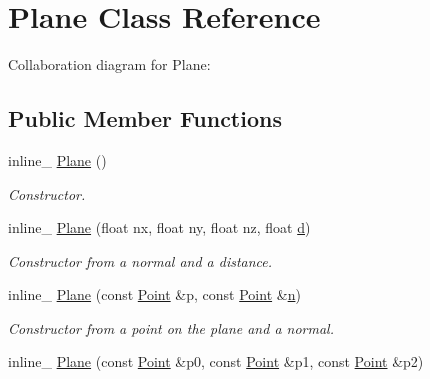 \hypertarget{class_plane}{\section{Plane Class Reference}
\label{class_plane}
}


Collaboration diagram for Plane\+:
\subsection*{Public Member Functions}
\begin{DoxyCompactItemize}
\item 
\hypertarget{class_plane_abcc405319cab7568a33e6e1df69f144b}{inline\+\_\+ \hyperlink{class_plane_abcc405319cab7568a33e6e1df69f144b}{Plane} ()}\label{class_plane_abcc405319cab7568a33e6e1df69f144b}

\begin{DoxyCompactList}\small\item\em Constructor. \end{DoxyCompactList}\item 
\hypertarget{class_plane_a017c62e05e26489aa7ffd72212f41a57}{inline\+\_\+ \hyperlink{class_plane_a017c62e05e26489aa7ffd72212f41a57}{Plane} (float nx, float ny, float nz, float \hyperlink{class_plane_a61fc789fce8fbe72914f5397f1bbed44}{d})}\label{class_plane_a017c62e05e26489aa7ffd72212f41a57}

\begin{DoxyCompactList}\small\item\em Constructor from a normal and a distance. \end{DoxyCompactList}\item 
\hypertarget{class_plane_a9190b680a24a52f01c23411087f8d7f4}{inline\+\_\+ \hyperlink{class_plane_a9190b680a24a52f01c23411087f8d7f4}{Plane} (const \hyperlink{class_point}{Point} \&p, const \hyperlink{class_point}{Point} \&\hyperlink{class_plane_af400cfb3367fc032b4223a587d605035}{n})}\label{class_plane_a9190b680a24a52f01c23411087f8d7f4}

\begin{DoxyCompactList}\small\item\em Constructor from a point on the plane and a normal. \end{DoxyCompactList}\item 
\hypertarget{class_plane_ae7fe972b936a126a3ed2d5e4da0fbca2}{inline\+\_\+ \hyperlink{class_plane_ae7fe972b936a126a3ed2d5e4da0fbca2}{Plane} (const \hyperlink{class_point}{Point} \&p0, const \hyperlink{class_point}{Point} \&p1, const \hyperlink{class_point}{Point} \&p2)}\label{class_plane_ae7fe972b936a126a3ed2d5e4da0fbca2}


\end{DoxyCompactItemize}
